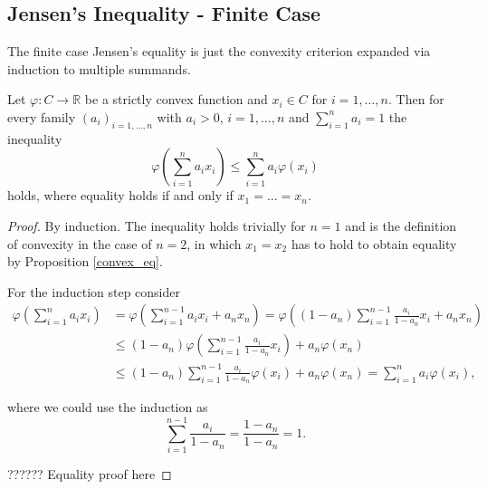 
\subsection{Jensen's Inequality - Finite Case}

The finite case Jensen's equality is just the convexity criterion expanded via induction to multiple summands.

\begin{proposition}
  Let $\varphi: C \to \mathbb{R}$ be a strictly convex function and $x_i \in C$ for $i=1,\dots,n$. Then for every family $(a_i)_{i=1,...,n}$ with $a_i > 0$, $i=1,\dots,n$ and $\sum_{i=1}^{n} a_i = 1$ the inequality
  \[
  \varphi\left(\sum_{i=1}^{n} a_i x_i\right) \leq \sum_{i=1}^{n} a_i \varphi(x_i)
  \]
  holds, where equality holds if and only if $x_1 = \ldots = x_n$.
\end{proposition}

\begin{proof}
  By induction. The inequality holds trivially for $n=1$ and is the definition of convexity in the case of $n=2$, in which $x_1 = x_2$ has to hold to obtain equality by Proposition \ref{convex_eq}.

  For the induction step consider
  \begin{align*}
    \varphi\left(\sum_{i=1}^{n} a_i x_i\right) &= \varphi\left( \sum_{i=1}^{n-1} a_ix_i + a_n x_n \right) = \varphi\left( (1-a_n) \sum_{i=1}^{n-1} \frac{a_i}{1-a_n}x_i + a_n x_n \right)\\
    & \leq (1-a_n) \varphi\left( \sum_{i=1}^{n-1} \frac{a_i}{1-a_n} x_i
   \right) + a_n \varphi(x_n) \\ & \leq (1 - a_n) \sum_{i=1}^{n-1}  \frac{a_i}{1-a_n} \varphi(x_i) + a_n \varphi(x_n) = \sum_{i=1}^{n} a_i \varphi(x_i),
  \end{align*}

  where we could use the induction as
  \[
  \sum_{i=1}^{n-1}  \frac{a_i}{1-a_n} = \frac{1-a_n}{1-a_n} = 1.
  \]

  ?????? Equality proof here
  
\end{proof}
